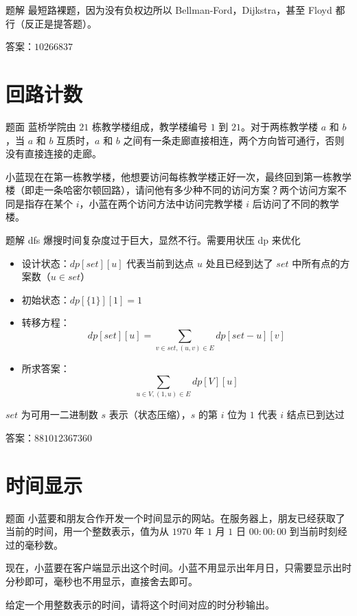 \documentclass{pptt}
\begin{document}
\begin{frame}{题解}
    最短路裸题，因为没有负权边所以 Bellman-Ford，Dijkstra，甚至 Floyd 都行（反正是提答题）。

    答案：$10266837$
\end{frame}

\section{回路计数}

\begin{frame}{题面}
    蓝桥学院由 $21$ 栋教学楼组成，教学楼编号 $1$ 到 $21$。对于两栋教学楼 $a$ 和 $b$，当 $a$ 和 $b$ 互质时，$a$ 和 $b$ 之间有一条走廊直接相连，两个方向皆可通行，否则没有直接连接的走廊。

    小蓝现在在第一栋教学楼，他想要访问每栋教学楼正好一次，最终回到第一栋教学楼（即走一条哈密尔顿回路），请问他有多少种不同的访问方案？两个访问方案不同是指存在某个 $i$，小蓝在两个访问方法中访问完教学楼 $i$ 后访问了不同的教学楼。
\end{frame}

\begin{frame}{题解}
    dfs 爆搜时间复杂度过于巨大，显然不行。需要用状压 dp 来优化

    \begin{itemize}
        \item 设计状态：$dp[set][u]$ 代表当前到达点 $u$ 处且已经到达了 $set$ 中所有点的方案数（$u \in set$）
        \item 初始状态：$dp[\{1\}][1]=1$
        \item 转移方程：$$dp[set][u]=\sum_{v \in set,(u,v) \in E}dp[set-u][v]$$
        \item 所求答案：$$\sum_{u \in V,(1,u) \in E}dp[V][u]$$
    \end{itemize}

    $set$ 为可用一二进制数 $s$ 表示（状态压缩），$s$ 的第 $i$ 位为 $1$ 代表 $i$ 结点已到达过

    答案：$881012367360$
\end{frame}

\section{时间显示}

\begin{frame}{题面}
    小蓝要和朋友合作开发一个时间显示的网站。在服务器上，朋友已经获取了当前的时间，用一个整数表示，值为从 $1970$ 年 $1$ 月 $1$ 日 $00:00:00$ 到当前时刻经过的毫秒数。

    现在，小蓝要在客户端显示出这个时间。小蓝不用显示出年月日，只需要显示出时分秒即可，毫秒也不用显示，直接舍去即可。

    给定一个用整数表示的时间，请将这个时间对应的时分秒输出。
\end{frame}
\end{document}
